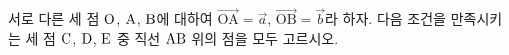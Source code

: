 서로 다른 세 점 $\mathrm{O}$, $\mathrm{A}$, $\mathrm{B}$에 대하여 $\overrightarrow{\mathrm{OA}}=\vec{a}$, $\overrightarrow{\mathrm{OB}}=\vec{b}$라 하자. 다음 조건을 만족시키는 세 점 $\mathrm{C}$, $\mathrm{D}$, $\mathrm{E}$ 중 직선 $\mathrm{AB}$ 위의 점을 모두 고르시오.  
